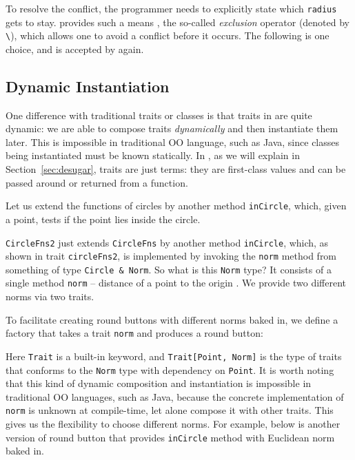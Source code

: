 To resolve the conflict, the programmer needs to explicitly state which
\lstinline{radius} gets to stay. \name provides such a means , the so-called
\textit{exclusion} operator (denoted by \lstinline{\}), which allows one to
avoid a conflict before it occurs. The following is one choice, and is accepted
by \name again.



\subsection{Dynamic Instantiation}

One difference with traditional traits or classes is that traits in \name are
quite dynamic: we are able to compose traits \textit{dynamically} and then
instantiate them later. This is impossible in traditional OO language, such as
Java, since classes being instantiated must be known statically. In \name, as we
will explain in Section~\ref{sec:desugar}, traits are just terms: they are
first-class values and can be passed around or returned from a function.

Let us extend the functions of circles by another method \lstinline{inCircle},
which, given a point, tests if the point lies inside the circle.

\lstinline{CircleFns2} just extends \lstinline{CircleFns} by another method
\lstinline{inCircle}, which, as shown in trait \lstinline{circleFns2}, is
implemented by invoking the \lstinline{norm} method from something of type
\lstinline{Circle & Norm}. So what is this \lstinline{Norm} type? It consists of
a single method \lstinline{norm} -- distance of a point to the origin . We
provide two different norms via two traits.

To facilitate creating round buttons with different norms baked in, we define a
factory that takes a trait \lstinline$norm$ and produces a round button:

Here \lstinline{Trait} is a built-in keyword, and \lstinline$Trait[Point, Norm]$
is the type of traits that conforms to the \lstinline$Norm$ type with dependency
on \lstinline{Point}. It is worth noting that this kind of dynamic composition
and instantiation is impossible in traditional OO languages, such as Java,
because the concrete implementation of \lstinline{norm} is unknown at
compile-time, let alone compose it with other traits. This gives us the
flexibility to choose different norms. For example, below is another version of
round button that provides \lstinline{inCircle} method with Euclidean norm baked
in.
